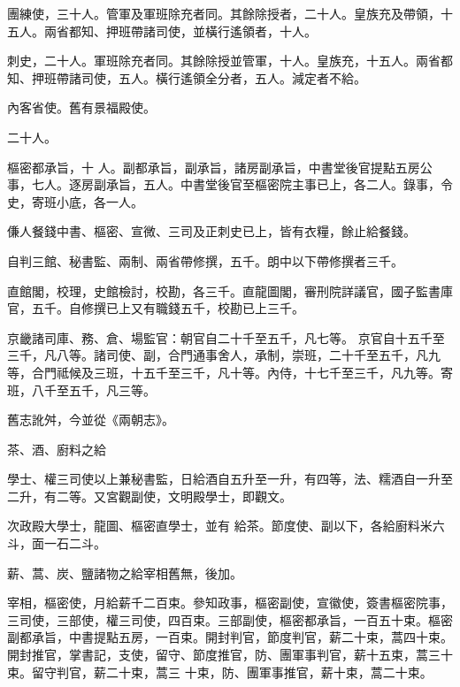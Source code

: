 \begin{pinyinscope}
 團練使，三十人。管軍及軍班除充者同。其餘除授者，二十人。皇族充及帶領，十五人。兩省都知、押班帶諸司使，並橫行遙領者，十人。



 刺史，二十人。軍班除充者同。其餘除授並管軍，十人。皇族充，十五人。兩省都知、押班帶諸司使，五人。橫行遙領全分者，五人。減定者不給。



 內客省使。舊有景福殿使。



 二十人。



 樞密都承旨，十
 人。副都承旨，副承旨，諸房副承旨，中書堂後官提點五房公事，七人。逐房副承旨，五人。中書堂後官至樞密院主事已上，各二人。錄事，令史，寄班小底，各一人。



 傔人餐錢中書、樞密、宣微、三司及正刺史已上，皆有衣糧，餘止給餐錢。



 自判三館、秘書監、兩制、兩省帶修撰，五千。朗中以下帶修撰者三千。



 直館閣，校理，史館檢討，校勘，各三千。直龍圖閣，審刑院詳議官，國子監書庫官，五千。自修撰已上又有職錢五千，校勘已上三千。



 京畿諸司庫、務、倉、場監官：朝官自二十千至五千，凡七等。
 京官自十五千至三千，凡八等。諸司使、副，合門通事舍人，承制，崇班，二十千至五千，凡九等，合門祗候及三班，十五千至三千，凡十等。內侍，十七千至三千，凡九等。寄班，八千至五千，凡三等。



 舊志訛舛，今並從《兩朝志》。



 茶、酒、廚料之給



 學士、權三司使以上兼秘書監，日給酒自五升至一升，有四等，法、糯酒自一升至二升，有二等。又宮觀副使，文明殿學士，即觀文。



 次政殿大學士，龍圖、樞密直學士，並有
 給茶。節度使、副以下，各給廚料米六斗，面一石二斗。



 薪、蒿、炭、鹽諸物之給宰相舊無，後加。



 宰相，樞密使，月給薪千二百束。參知政事，樞密副使，宣徽使，簽書樞密院事，三司使，三部使，權三司使，四百束。三部副使，樞密都承旨，一百五十束。樞密副都承旨，中書提點五房，一百束。開封判官，節度判官，薪二十束，蒿四十束。開封推官，掌書記，支使，留守、節度推官，防、團軍事判官，薪十五束，蒿三十束。留守判官，薪二十束，蒿三
 十束，防、團軍事推官，薪十束，蒿二十束。




\end{pinyinscope}
